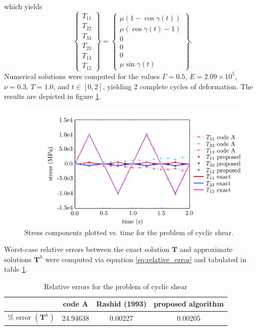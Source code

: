 which yields
\begin{equation}
    \left\{ \begin{array}{c} T_{11} \\ T_{22} \\ T_{33} \\ T_{23} \\ T_{13} \\ T_{12} \end{array} \right\} = \left\{ \begin{array}{c} \mu (1-\cos \gamma (t)) \\ \mu (\cos \gamma (t) - 1) \\ 0 \\ 0 \\ 0 \\ \mu \sin \gamma (t) \end{array} \right\}.
\end{equation}
Numerical solutions were computed for the values $\Gamma = 0.5$, $E = 2.09 \times 10^5$, $\nu = 0.3$, $T = 1.0$, and $t \in \left[ 0, 2 \right]$, yielding 2 complete cycles of deformation. The results are depicted in figure \ref{fig.cyclic_shear-cm1}.

\begin{figure}
\centering
\includegraphics[scale=0.75]{src/media/cyclic_shear}
\caption{Stress components plotted vs. time for the problem of cyclic shear.}
\label{fig.cyclic_shear-cm1}
\end{figure}

Worst-case relative errors between the exact solution $\mathbf{T}$ and approximate solutions $\mathbf{T}^h$ were computed via equation \ref{eq:relative_error} and tabulated in table \ref{tab.cyclic_shear-cm1}.

\begin{table}[]
\centering
\caption{Relative errors for the problem of cyclic shear}
\label{tab.cyclic_shear-cm1}
\begin{tabular}{c|c|c|c}
& code A & Rashid (1993) & proposed algorithm  \\ \hline
\% error $(\mathbf{T}^h)$ & 24.94638 & 0.00227 & 0.00205
\end{tabular}
\end{table}

